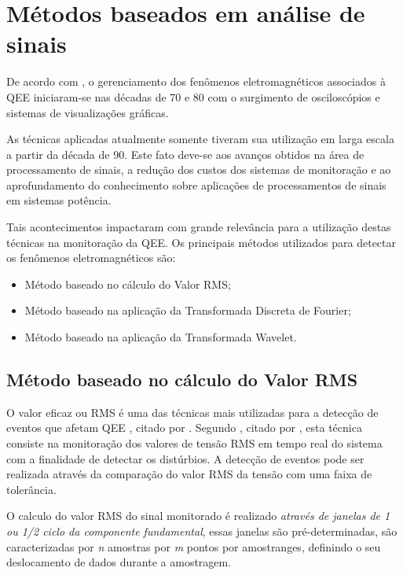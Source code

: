 \section{Métodos baseados em análise de sinais}
\par
De acordo com \cite{JUN09}, o gerenciamento dos fenômenos eletromagnéticos associados à \ac{QEE} iniciaram-se nas décadas de 70 e 80 com o surgimento de osciloscópios e sistemas de visualizações gráficas.
\par
As técnicas aplicadas atualmente somente tiveram sua utilização em larga escala a partir da década de 90. Este fato deve-se aos avanços obtidos na área de processamento de sinais, a redução dos custos dos sistemas de monitoração e ao aprofundamento do conhecimento sobre aplicações de processamentos de sinais em sistemas potência.
\par
Tais acontecimentos impactaram com grande relevância para a utilização destas técnicas na monitoração da \ac{QEE}. Os principais métodos utilizados para detectar os fenômenos eletromagnéticos são:
\begin{itemize}
\item Método baseado no cálculo do Valor \ac{RMS}; 
\item Método baseado na aplicação da Transformada Discreta de Fourier;
\item Método baseado na aplicação da Transformada Wavelet.
\end{itemize}
\subsection{Método baseado no cálculo do Valor \ac{RMS}}
\par
O valor eficaz ou RMS é uma das técnicas mais utilizadas para a detecção de eventos que afetam \ac{QEE} \citep{KAG09}
, citado por \citep{BAC11}. Segundo \cite{THE99}, citado por \cite{JUN09}, esta técnica consiste na monitoração dos valores de tensão \ac{RMS} em tempo real do sistema com a finalidade de detectar os distúrbios. A detecção de eventos pode ser realizada através da comparação do valor \ac{RMS} da tensão com uma faixa de tolerância. 
\par 
O calculo do valor \ac{RMS} do sinal monitorado é realizado \emph{através de janelas de 1 ou 1/2 ciclo da componente fundamental}, essas janelas são pré-determinadas, são caracterizadas por \emph{n} amostras por \emph{m} pontos por amostranges, definindo o seu deslocamento de dados durante a amostragem. 
